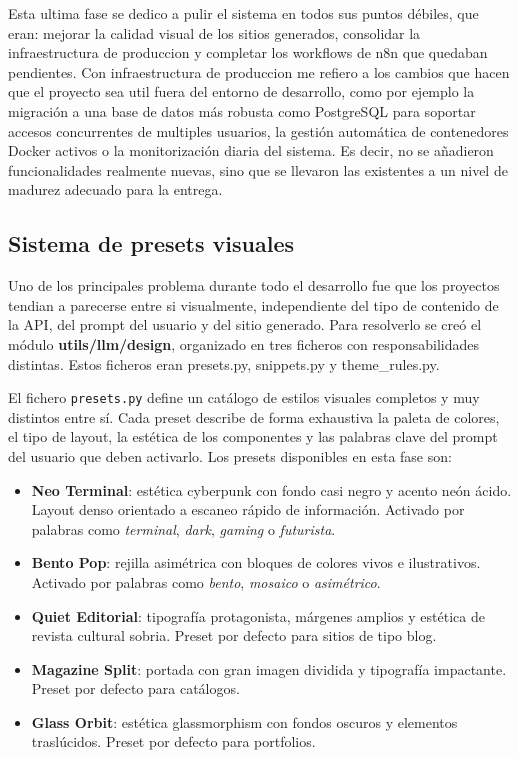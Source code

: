Esta ultima fase se dedico a pulir el sistema en todos sus puntos débiles, que eran: mejorar la calidad visual de los sitios generados, consolidar la infraestructura de produccion y completar los workflows de n8n que quedaban pendientes. Con infraestructura de produccion me refiero a los cambios que hacen que el proyecto sea util fuera del entorno de desarrollo, como por ejemplo la migración a una base de datos más robusta como PostgreSQL para soportar accesos concurrentes de multiples usuarios, la gestión automática de contenedores Docker activos o la monitorización diaria del sistema. Es decir, no se añadieron funcionalidades realmente nuevas, sino que se llevaron las existentes a un nivel de madurez adecuado para la entrega.


\subsection{Sistema de presets visuales}
\label{subsec:sistema-presets-visuales}

Uno de los principales problema durante todo el desarrollo fue que los proyectos tendian a parecerse entre si visualmente, independiente del tipo de contenido de la API, del prompt del usuario y del sitio generado. Para resolverlo se creó el módulo \textbf{utils/llm/design}, organizado en tres ficheros con responsabilidades distintas. Estos ficheros eran presets.py, snippets.py y theme\_rules.py.

El fichero \texttt{presets.py} define un catálogo de estilos visuales completos y muy distintos entre sí. Cada preset describe de forma exhaustiva la paleta de colores, el tipo de layout, la estética de los componentes y las palabras clave del prompt del usuario que deben activarlo. Los presets disponibles en esta fase son:

\begin{itemize}
    \item \textbf{Neo Terminal}: estética cyberpunk con fondo casi negro y acento neón ácido. Layout denso orientado a escaneo rápido de información. Activado por palabras como \emph{terminal}, \emph{dark}, \emph{gaming} o \emph{futurista}.
    \item \textbf{Bento Pop}: rejilla asimétrica con bloques de colores vivos e ilustrativos. Activado por palabras como \emph{bento}, \emph{mosaico} o \emph{asimétrico}.
    \item \textbf{Quiet Editorial}: tipografía protagonista, márgenes amplios y estética de revista cultural sobria. Preset por defecto para sitios de tipo blog.
    \item \textbf{Magazine Split}: portada con gran imagen dividida y tipografía impactante. Preset por defecto para catálogos.
    \item \textbf{Glass Orbit}: estética glassmorphism con fondos oscuros y elementos traslúcidos. Preset por defecto para portfolios.
\end{itemize} 

